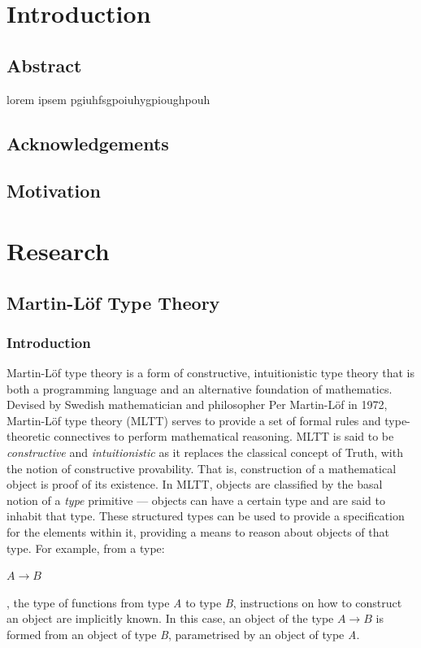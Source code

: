 \documentclass[12pt]{report}
\begin{document}
\part{Introduction}

\chapter{Abstract}
\begin{center}

lorem ipsem pgiuhfsgpoiuhygpioughpouh

\end{center}

\chapter{Acknowledgements}


\chapter{Motivation}

\part{Research}

\chapter{Martin-L\"of Type Theory}
\section{Introduction}
Martin-L\"of type theory is a form of constructive, intuitionistic type theory that is both a programming language and an alternative foundation of mathematics. Devised by Swedish mathematician and philosopher Per Martin-L\"of in 1972, Martin-L\"of type theory (MLTT) serves to provide a set of formal rules and type-theoretic connectives to perform mathematical reasoning.
MLTT is said to be \textit{constructive} and \textit{intuitionistic} as it replaces the classical concept of Truth, with the notion of constructive provability. That is, construction of a mathematical object is proof of its existence. In MLTT, objects are classified by the basal notion of a \textit{type} primitive --- objects can have a certain type and are said to inhabit that type. These structured types can be used to provide a specification for the elements within it, providing a means to reason about objects of that type. For example, from a type:
\begin{center}
$A \rightarrow B$
\end{center}
, the type of functions from type \textit{A} to type \textit{B}, instructions on how to construct an object are implicitly known. In this case, an object of the type $A \rightarrow B$ is formed from an object of type \textit{B}, parametrised by an object of type \textit{A}.
\end{document}
